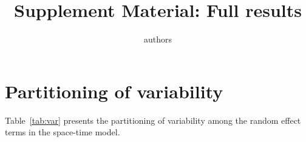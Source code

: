 \documentclass[12pt]{article}\usepackage[]{graphicx}\usepackage[]{color}
\begin{document}


% 
% 

\title{Supplement Material: Full results}
\author{authors}

\sloppy
\maketitle
\tableofcontents
{}
\clearpage
\section{Partitioning of variability}
Table~\ref{tab:var} presents the partitioning of variability among the random effect terms in the space-time model.
\end{document}
